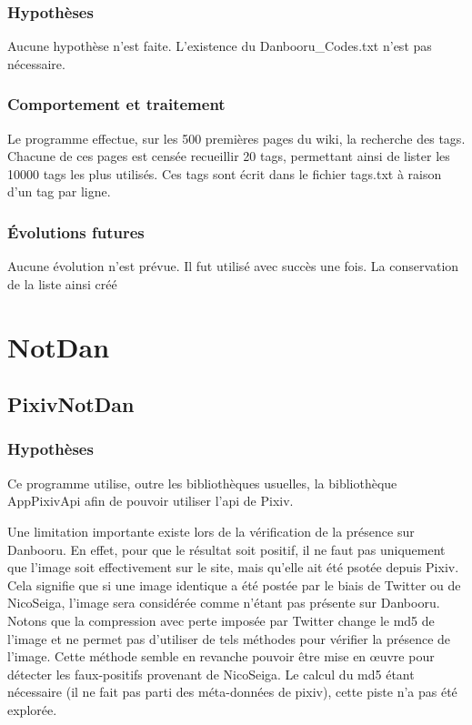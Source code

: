 \documentclass[a4paper,12pt]{article}
\begin{document}
\subsubsection{Hypothèses}
Aucune hypothèse n'est faite. L'existence du Danbooru\_Codes.txt n'est pas nécessaire. 
\subsubsection{Comportement et traitement}
Le programme effectue, sur les 500 premières pages du wiki, la recherche des tags. Chacune de ces pages est censée recueillir 20 tags, permettant ainsi de lister les 10000 tags les plus utilisés.
Ces tags sont écrit dans le fichier tags.txt à raison d'un tag par ligne.
\subsubsection{Évolutions futures}
Aucune évolution n'est prévue. Il fut utilisé avec succès une fois. La conservation de la liste ainsi créé 

\section{NotDan}
\subsection{PixivNotDan}
\subsubsection{Hypothèses}
Ce programme utilise, outre les bibliothèques usuelles, la bibliothèque AppPixivApi afin de pouvoir utiliser l'api de Pixiv. 

Une limitation importante existe lors de la vérification de la présence sur Danbooru. En effet, pour que le résultat soit positif, il ne faut pas uniquement que l'image soit effectivement sur le site, mais qu'elle ait été psotée depuis Pixiv. Cela signifie que si une image identique a été postée par le biais de Twitter ou de NicoSeiga, l'image sera considérée comme n'étant pas présente sur Danbooru. Notons que la compression avec perte imposée par Twitter change le md5 de l'image et ne permet pas d'utiliser de tels méthodes pour vérifier la présence de l'image. Cette méthode semble en revanche pouvoir être mise en œuvre pour détecter les faux-positifs provenant de NicoSeiga. Le calcul du md5 étant nécessaire (il ne fait pas parti des méta-données de pixiv), cette piste n'a pas été explorée.
\end{document}
